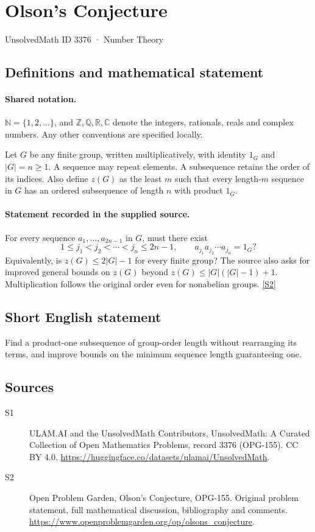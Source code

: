 \documentclass[11pt]{article}
\newcommand{\sref}[2]{\hyperlink{source:#1:#2}{[S#2]}}
\begin{document}
\setcounter{section}{3375}
\section{Olson's Conjecture}\label{3376}
{\small\sffamily UnsolvedMath ID 3376 · Number Theory}
\subsection{Definitions and mathematical statement}

\paragraph{Shared notation.}$\mathbb N=\{1,2,\ldots\}$, and $\mathbb Z,\mathbb Q,\mathbb R,\mathbb C$ denote the integers, rationals, reals and complex numbers. Any other conventions are specified locally.


Let $G$ be any finite group, written multiplicatively, with identity $1_G$ and $|G|=n\ge1$. A sequence may repeat elements. A subsequence retains the order of its indices. Also define $z(G)$ as the least $m$ such that every length-$m$ sequence in $G$ has an ordered subsequence of length $n$ with product $1_G$.
\paragraph{Statement recorded in the supplied source.}
For every sequence $a_1,\ldots,a_{2n-1}$ in $G$, must there exist
\[
 1\le j_1<j_2<\cdots<j_n\le2n-1,
 \qquad a_{j_1}a_{j_2}\cdots a_{j_n}=1_G?
\]
Equivalently, is $z(G)\le2|G|-1$ for every finite group? The source also asks for improved general bounds on $z(G)$ beyond $z(G)\le|G|(|G|-1)+1$. Multiplication follows the original order even for nonabelian groups. \sref{3376}{2}
\subsection{Short English statement}
Find a product-one subsequence of group-order length without rearranging its terms, and improve bounds on the minimum sequence length guaranteeing one.
\subsection{Sources}
\begin{description}
\item[\hypertarget{source:3376:1}{S1}] ULAM.AI and the UnsolvedMath Contributors, UnsolvedMath: A Curated Collection of Open Mathematics Problems, record 3376 (OPG-155). CC BY 4.0. \url{https://huggingface.co/datasets/ulamai/UnsolvedMath}.
\item[\hypertarget{source:3376:2}{S2}] Open Problem Garden, Olson's Conjecture, OPG-155. Original problem statement, full mathematical discussion, bibliography and comments. \url{https://www.openproblemgarden.org/op/olsons_conjecture}.
\end{description}
\label{end:3376}
\end{document}
